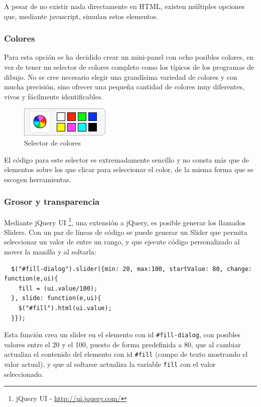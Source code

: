 A pesar de no existir nada directamente en HTML, existen múltiples opciones que, mediante javascript, simulan estos elementos.

\subsubsection{Colores} %
\label{ssub:colores}
Para esta opción se ha decidido crear un mini-panel con ocho posibles colores, en vez de tener un selector de colores completo como los típicos de los programas de dibujo. No se cree necesario elegir una grandísima variedad de colores y con mucha precisión, sino ofrecer una pequeña cantidad de colores muy diferentes, vivos y fácilmente identificables.

\begin{figure}[h!]
\centering
\includegraphics{color_selector.png}
\caption{Selector de colores}\label{fig:color_selector}
\end{figure}

El código para este selector es extremadamente sencillo y no consta más que de elementos sobre los que clicar para seleccionar el color, de la misma forma que se escogen herramientas.
\subsubsection{Grosor y transparencia} %
\label{ssub:grosor_y_transparencia}
Mediante jQuery UI \footnote{jQuery UI - \url{http://ui.jquery.com/}}, una extensión a jQuery, es posible generar los llamados Sliders. Con un par de líneas de código se puede generar un Slider que permita seleccionar un valor de entre un rango, y que ejecute código personalizado al mover la manilla y al soltarla:
\begin{verbatim}
  $("#fill-dialog").slider({min: 20, max:100, startValue: 80, change: function(e,ui){
    fill = (ui.value/100);
  }, slide: function(e,ui){
    $("#fill").html(ui.value);
  }});
\end{verbatim}
Esta función crea un slider en el elemento con id \texttt{\#fill-dialog}, con posibles valores entre el 20 y el 100, puesto de forma predefinida a 80, que al cambiar actualiza el contenido del elemento con id \texttt{\#fill} (campo de texto mostrando el valor actual), y que al soltarse actualiza la variable \texttt{fill} con el valor seleccionado.

